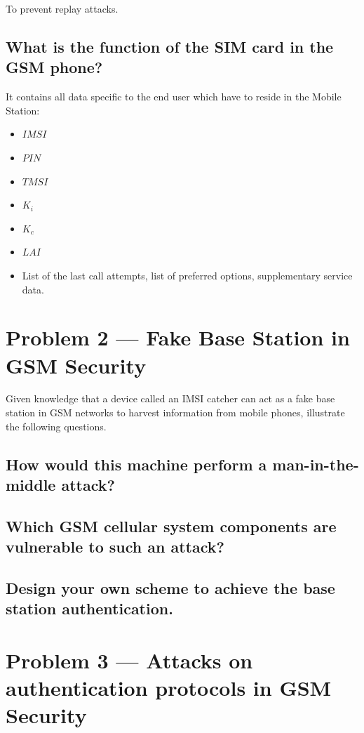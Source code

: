 \documentclass[a4paper]{report}
\begin{document}
To prevent replay attacks.

\subsection{What is the function of the SIM card in the GSM phone?}

It contains all data specific to the end user which have to reside in the Mobile Station:

\begin{itemize}
\item $IMSI$
\item $PIN$
\item $TMSI$
\item $K_i$
\item $K_c$
\item $LAI$
\item List of the last call attempts, list of preferred options, supplementary service data. 
\end{itemize}

\section{Problem 2 --- Fake Base Station in GSM Security}

Given knowledge that a device called an IMSI catcher can act as a fake base station in GSM
networks to harvest information from mobile phones, illustrate the following questions.

\subsection{How would this machine perform a man-in-the-middle attack?}

\subsection{Which GSM cellular system components are vulnerable to such an attack?}

\subsection{Design your own scheme to achieve the base station authentication.}

\section{Problem 3 --- Attacks on authentication protocols in GSM Security}
\end{document}
